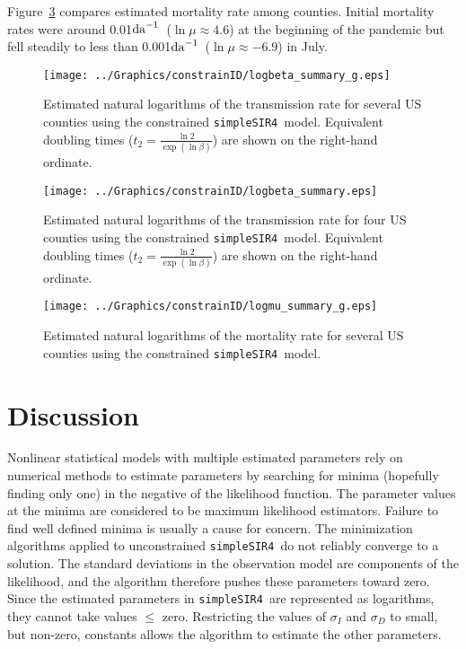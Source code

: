\documentclass[12pt,letterpaper]{article}
\newcommand\perda{$\rm{da}^{-1}$}
\newcommand\SSm{{\tt simpleSIR4}}
\begin{document}
Figure~\ref{fig:drates} compares estimated mortality rate among
counties. Initial mortality rates were around 
0.01\perda\ ($\ln \mu \approx 4.6$) at the beginning of
the pandemic but fell steadily to less than 
0.001\perda\ ($\ln \mu \approx -6.9$) in July.

\begin{figure}
\begin{center}
\texttt{[image: ../Graphics/constrainID/logbeta\_summary\_g.eps]}\\
\end{center}
\caption{\label{fig:xrates}
Estimated natural logarithms of the transmission rate for several US
counties using the constrained \SSm\ model.
Equivalent doubling times ($t_2 = \frac{\ln 2}{\exp(\ln \beta)}$)
are shown on the right-hand ordinate.
}
\end{figure}

\begin{figure}
\begin{center}
\texttt{[image: ../Graphics/constrainID/logbeta\_summary.eps]}\\
\end{center}
\caption{\label{fig:xrates2}
Estimated natural logarithms of the transmission rate for four US
counties using the constrained \SSm\ model.
Equivalent doubling times ($t_2 = \frac{\ln 2}{\exp(\ln \beta)}$)
are shown on the right-hand ordinate.
}
\end{figure}

\begin{figure}
\begin{center}
\texttt{[image: ../Graphics/constrainID/logmu\_summary\_g.eps]}\\
\end{center}
\caption{\label{fig:drates}
Estimated natural logarithms of the mortality rate for several US counties using the
constrained \SSm\ model.
}
\end{figure}

\section*{Discussion}

Nonlinear statistical models with multiple estimated parameters rely
on numerical methods to estimate parameters by searching for minima
(hopefully finding only one) in the negative of the likelihood
function. The parameter values at the minima are considered to be
maximum likelihood estimators. Failure to find well defined minima is
usually a cause for concern. The minimization algorithms applied to
unconstrained \SSm\ do not reliably converge to a solution. The
standard deviations in the observation model are components of the
likelihood, and the algorithm therefore pushes these parameters toward zero.
Since the estimated parameters in \SSm\ are represented as logarithms,
they cannot take values $\le$ zero. Restricting the values of
$\sigma_I$ and $\sigma_D$ to small, but non-zero, constants allows the
algorithm to estimate the other parameters.
\end{document}
